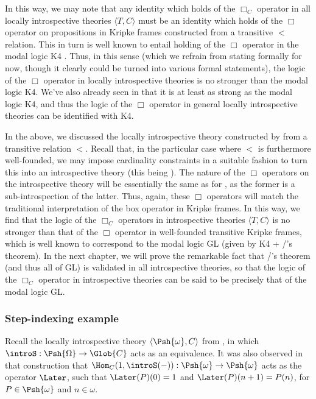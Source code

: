 In this way, we may note that any identity which holds of the $\Box_C$ operator in all locally introspective theories $\langle T, C \rangle$ must be an identity which holds of the $\Box$ operator on propositions in Kripke frames constructed from a transitive $<$ relation. This in turn is well known to entail holding of the $\Box$ operator in the modal logic K4 . Thus, in this sense (which we refrain from stating formally for now, though it clearly could be turned into various formal statements), the logic of the $\Box$ operator in locally introspective theories is no stronger than the modal logic K4. We've also already seen in  that it is at least as strong as the modal logic K4, and thus the logic of the $\Box$ operator in general locally introspective theories can be identified with K4.

In the above, we discussed the locally introspective theory constructed by  from a transitive relation $<$. Recall that, in the particular case where $<$ is furthermore well-founded, we may impose cardinality constraints in a suitable fashion to turn this into an introspective theory (this being ). The nature of the $\Box$ operators on the introspective theory  will be essentially the same as for , as the former is a sub-introspection of the latter. Thus, again, these $\Box$ operators will match the traditional interpretation of the box operator in Kripke frames. In this way, we find that the logic of the $\Box_C$ operators in introspective theories $\langle T, C \rangle$ is no stronger than that of the $\Box$ operator in well-founded transitive Kripke frames, which is well known to correspond to the modal logic GL (given by K4 + \Loeb/'s theorem). In the next chapter, we will prove the remarkable fact that \Loeb/'s theorem (and thus all of GL) is validated in all introspective theories, so that the logic of the $\Box_C$ operator in introspective theories can be said to be precisely that of the modal logic GL.

\subsubsection{Step-indexing example}\label{StepIndexingModal}
Recall the locally introspective theory $\langle \Psh{\omega}, C \rangle$ from , in which $\introS : \Psh{\Omega} \to \Glob{C}$ acts as an equivalence. It was also observed in that construction that $\Hom_C(1, \introS(-)) : \Psh{\omega} \to \Psh{\omega}$ acts as the operator $\Later$, such that $\Later(P)(0) = 1$ and $\Later(P)(n + 1) = P(n)$, for $P \in \Psh{\omega}$ and $n \in \omega$.

